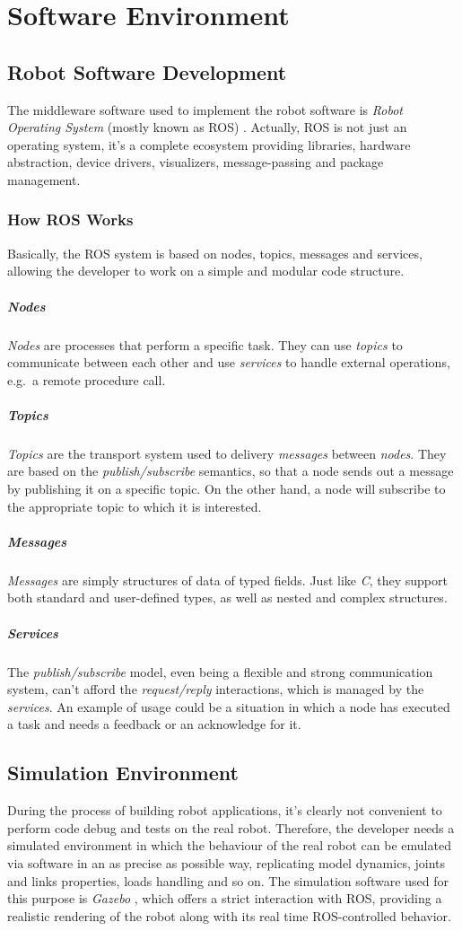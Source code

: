 \section{Software Environment}
\subsection{Robot Software Development}
The middleware software used to implement the robot software is \textit{Robot Operating System} (mostly known as ROS) \cite{webros}. Actually, ROS is not just an operating system, it's a complete ecosystem providing libraries, hardware abstraction, device drivers, visualizers, message-passing and package management. 

\subsubsection{How ROS Works}
Basically, the ROS system is based on nodes, topics, messages and services, allowing the developer to work on a simple and modular code structure.

\subparagraph*{Nodes}
\textit{Nodes} are processes that perform a specific task. They can use \textit{topics} to communicate between each other and use \textit{services} to handle external operations, e.g.\ a remote procedure call.

\subparagraph*{Topics}
\textit{Topics} are the transport system used to delivery \textit{messages} between \textit{nodes}. They are based on the \textit{publish/subscribe} semantics, so that a node sends out a message by publishing it on a specific topic. On the other hand, a node will subscribe to the appropriate topic to which it is interested.

\subparagraph*{Messages}
\textit{Messages} are simply structures of data of typed fields. Just like \textit{C}, they support both standard and user-defined types, as well as nested and complex structures.

\subparagraph*{Services}
The \textit{publish/subscribe} model, even being a flexible and strong communication system, can't afford the \textit{request/reply} interactions, which is managed by the \textit{services}. An example of usage could be a situation in which a node has executed a task and needs a feedback or an acknowledge for it.

\subsection{Simulation Environment}
During the process of building robot applications, it's clearly not convenient to perform code debug and tests on the real robot. Therefore, the developer needs a simulated environment in which the behaviour of the real robot can be emulated via software in an as precise as possible way, replicating model dynamics, joints and links properties, loads handling and so on. The simulation software used for this purpose is \textit{Gazebo} \cite{webgazebo}, which offers a strict interaction with ROS, providing a realistic rendering of the robot along with its real time ROS-controlled behavior. 

